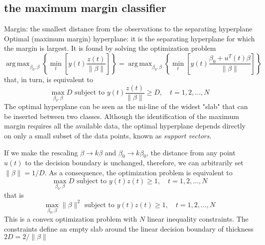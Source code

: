 \documentclass{book}
\DeclareMathOperator*{\argmax}{arg\,max}
\theoremstyle{definition}
\theoremstyle{remark}
\theoremstyle{remark}
\begin{document}
\subsection{the maximum margin classifier}
Margin: the smallest distance from the observations to the separating hyperplane\\
Optimal (maximum margin) hyperplane: it is the separating hyperplane for which the margin is largest.
It is found by solving the optimization problem
\[
    \argmax_{\beta_0,\beta}\left\{\min_t\left[y(t)\displaystyle\frac{z(t)}{\|\beta\|} \right] \right\}  = \argmax_{\beta_0,\beta}\left\{\min_t\left[y(t)\displaystyle\frac{\beta_0+u^T(t)\beta}{\|\beta\|} \right] \right\}
\]
that, in turn, is equivalent to 
\[
    \max_{\beta_0,\beta}D \text{ subject to } y(t)\displaystyle\frac{z(t)}{\|\beta\|}\geq D, \quad t=1,2,\dots,N
\]
The optimal hyperplane can be seen as the mi-line of the widest "slab" that can be inserted between two classes. Although the identification of the maximum margin requires all the available data, the optimal hyperplane depends directly on only a small subset of the data points, known as \emph{support vectors}. 

If we make the rescaling $\beta\to k\beta$ and $\beta_0 \to k\beta_0$, the distance from any point $u(t)$ to the decision boundary is unchanged, therefore, we can arbitrarily set $\|\beta\|=1/D$. As a consequence, the optimization problem is equivalent to 
\[
    \max_{\beta_0,\beta}D \text{ subject to } y(t)z(t)\geq 1, \quad t = 1,2,\dots,N
\]
that is
\[
    \max_{\beta_0,\beta}\|\beta\|^2 \text{ subject to } y(t)z(t)\geq 1, \quad t = 1,2,\dots,N
\]
This is a convex optimization problem with $N$ linear inequality constraints. The constraints define an empty slab around the linear decision boundary of thickness $2D=2/\|\beta\|$ 
\end{document}
